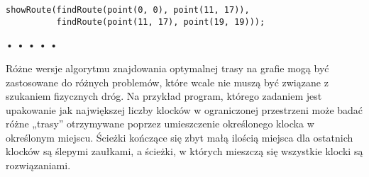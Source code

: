   
\begin{verbatim} 
showRoute(findRoute(point(0, 0), point(11, 17)),
          findRoute(point(11, 17), point(19, 19)));
 \end{verbatim}


\begin{center}
• • • • •
\end{center}

  
Różne wersje algorytmu znajdowania optymalnej trasy na grafie mogą być zastosowane do różnych problemów, które wcale nie muszą być związane z szukaniem fizycznych dróg. Na przykład program, którego zadaniem jest upakowanie jak największej liczby klocków w ograniczonej przestrzeni może badać różne „trasy” otrzymywane poprzez umieszczenie określonego klocka w określonym miejscu. Ścieżki kończące się zbyt małą ilością miejsca dla ostatnich klocków są ślepymi zaułkami, a ścieżki, w których mieszczą się wszystkie klocki są rozwiązaniami.